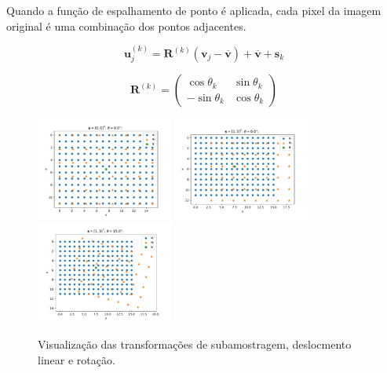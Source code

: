 \documentclass[12pt,openright,oneside,a4paper,english,brazil]{abntex2}
\begin{document}
Quando a função de espalhamento de ponto é aplicada, cada pixel da imagem original é uma combinação dos pontos adjacentes.


\begin{equation}
	\label{eq:psfcenter}
	\mathbf{u}^{(k)}_j = \mathbf{R}^{(k)}(\mathbf{v}_j-\mathbf{\overline{v}})+\mathbf{\overline{v}}+\mathbf{s}_k
\end{equation}

\begin{equation}
	\mathbf{R}^{(k)} = 
	\begin{pmatrix}
		\cos \theta_k & \sin \theta_k \\
		- \sin \theta_k & \cos \theta_k
	\end{pmatrix}
\end{equation}

\begin{figure}
	\centering
	\includegraphics[width=0.4\textwidth]{./figures/transform1.pdf}
	\includegraphics[width=0.4\textwidth]{./figures/transform2.pdf}
	\includegraphics[width=0.4\textwidth]{./figures/transform3.pdf}
	\caption{Visualização das transformações de subamostragem, deslocmento linear e rotação.}
	\label{fig:transformations}
\end{figure}
\end{document}
